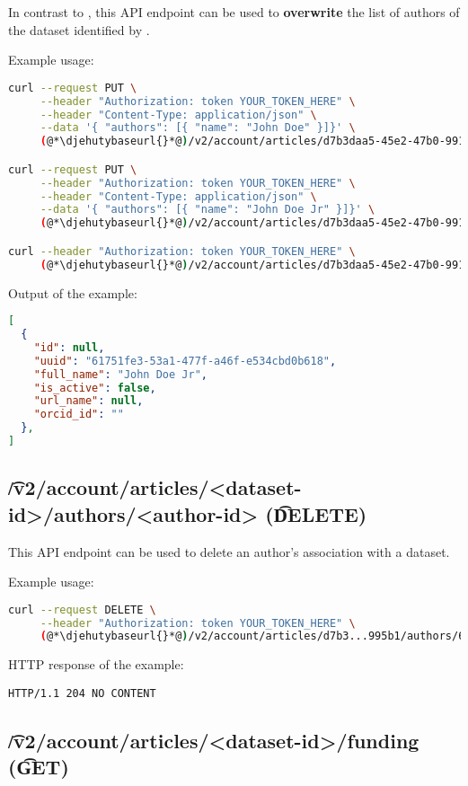   In contrast to , this API endpoint
  can be used to \textbf{overwrite} the list of authors of the dataset identified
  by .

  Example usage:
\begin{lstlisting}[language=bash]
curl --request PUT \
     --header "Authorization: token YOUR_TOKEN_HERE" \
     --header "Content-Type: application/json" \
     --data '{ "authors": [{ "name": "John Doe" }]}' \
     (@*\djehutybaseurl{}*@)/v2/account/articles/d7b3daa5-45e2-47b0-9910-0f7fa6a995b1/authors

curl --request PUT \
     --header "Authorization: token YOUR_TOKEN_HERE" \
     --header "Content-Type: application/json" \
     --data '{ "authors": [{ "name": "John Doe Jr" }]}' \
     (@*\djehutybaseurl{}*@)/v2/account/articles/d7b3daa5-45e2-47b0-9910-0f7fa6a995b1/authors

curl --header "Authorization: token YOUR_TOKEN_HERE" \
     (@*\djehutybaseurl{}*@)/v2/account/articles/d7b3daa5-45e2-47b0-9910-0f7fa6a995b1 | jq
\end{lstlisting}

  Output of the example:
\begin{lstlisting}[language=JSON]
[
  {
    "id": null,
    "uuid": "61751fe3-53a1-477f-a46f-e534cbd0b618",
    "full_name": "John Doe Jr",
    "is_active": false,
    "url_name": null,
    "orcid_id": ""
  },
]
\end{lstlisting}

\subsection{\t{/v2/account/articles/<dataset-id>/authors/<author-id>} (\t{DELETE})}

  This API endpoint can be used to delete an author's association with a dataset.

  Example usage:
\begin{lstlisting}[language=bash]
curl --request DELETE \
     --header "Authorization: token YOUR_TOKEN_HERE" \
     (@*\djehutybaseurl{}*@)/v2/account/articles/d7b3...995b1/authors/6175...0b618
\end{lstlisting}

  HTTP response of the example:
\begin{lstlisting}
HTTP/1.1 204 NO CONTENT
\end{lstlisting}

\subsection{\t{/v2/account/articles/<dataset-id>/funding} (\t{GET})}

